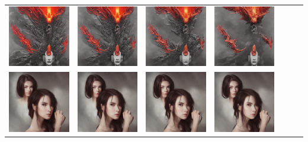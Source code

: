 \begin{table}[!htb]
\begin{tabular}{c c@{}c@{}c@{}c@{}c@{}c}
    \includegraphics[width=0.135\linewidth]{chapter/appendix/def_imgs/phoenix/p_30.png} &
    \includegraphics[width=0.135\linewidth]{chapter/appendix/def_imgs/phoenix/p_40.png} &
    \includegraphics[width=0.135\linewidth]{chapter/appendix/def_imgs/phoenix/p_50.png} &
    \includegraphics[width=0.135\linewidth]{chapter/appendix/def_imgs/phoenix/p_60.png} \\
    \includegraphics[width=0.135\linewidth]{chapter/appendix/def_imgs/woman2/w2_0.png} & 
    \includegraphics[width=0.135\linewidth]{chapter/appendix/def_imgs/woman2/w2_10.png} &
    \includegraphics[width=0.135\linewidth]{chapter/appendix/def_imgs/woman2/w2_20.png} &
    \includegraphics[width=0.135\linewidth]{chapter/appendix/def_imgs/woman2/w2_30.png} &

\end{tabular}
\end{table}
